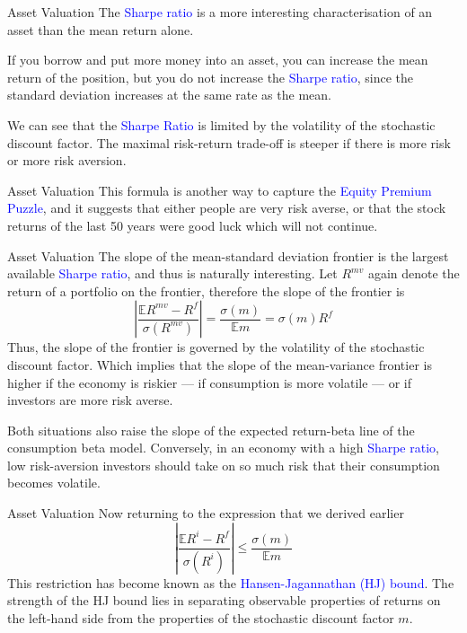 \documentclass[aspectratio=169,xcolor=dvipsnames]{beamer}
\begin{document}
\begin{frame}{Asset Valuation}
    The \textcolor{blue}{Sharpe ratio} is a more interesting characterisation of an asset than the mean return alone.

    If you borrow and put more money into an asset, you can increase the mean return of the position, but you do not increase the \textcolor{blue}{Sharpe ratio}, since the standard deviation increases at the same rate as the mean.

    We can see that the \textcolor{blue}{Sharpe Ratio} is limited by the volatility of the stochastic discount factor. The maximal risk-return trade-off is steeper if there is more risk or more risk aversion.
\end{frame}

\begin{frame}{Asset Valuation}
    This formula is another way to capture the \textcolor{blue}{Equity Premium Puzzle}, and it suggests that either people are very risk averse, or that the stock returns of the last 50 years were good luck which will not continue.
\end{frame}

\begin{frame}{Asset Valuation}
    The slope of the mean-standard deviation frontier is the largest available \textcolor{blue}{Sharpe ratio}, and thus is naturally interesting. Let $R^{mv}$ again denote the return of a portfolio on the frontier, therefore the slope of the frontier is
    \[
        \left| \frac{\mathbb{E} R^{mv} - R^f}{\sigma(R^{mv})} \right| = \frac{\sigma(m)}{\mathbb{E} m} = \sigma(m) R^f
    \]
    Thus, the slope of the frontier is governed by the volatility of the stochastic discount factor. Which implies that the slope of the mean-variance frontier is higher if the economy is riskier --- if consumption is more volatile --- or if investors are more risk averse.

    Both situations also raise the slope of the expected return-beta line of the consumption beta model. Conversely, in an economy with a high \textcolor{blue}{Sharpe ratio}, low risk-aversion investors should take on so much risk that their consumption becomes volatile.
\end{frame}

\begin{frame}{Asset Valuation}
    Now returning to the expression that we derived earlier
    \[
        \left| \frac{\mathbb{E} R^i - R^f}{\sigma(R^i)} \right| \le \frac{\sigma(m)}{\mathbb{E} m}
    \]
    This restriction has become known as the \textcolor{blue}{Hansen-Jagannathan (HJ) bound}. The strength of the HJ bound lies in separating observable properties of returns on the left-hand side from the properties of the stochastic discount factor $m$.
\end{frame}
\end{document}
